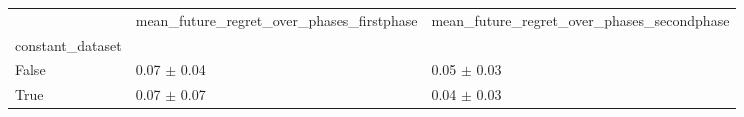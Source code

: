 \begin{tabular}{lll}
\toprule
 & mean_future_regret_over_phases_firstphase & mean_future_regret_over_phases_secondphase \\
constant_dataset &  &  \\
\midrule
False & 0.07 $\pm$ 0.04 & 0.05 $\pm$ 0.03 \\
True & 0.07 $\pm$ 0.07 & 0.04 $\pm$ 0.03 \\
\bottomrule
\end{tabular}
